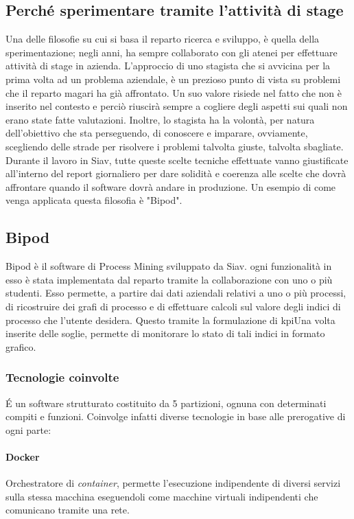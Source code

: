 \subsection{Perché sperimentare tramite l'attività di stage}
Una delle filosofie su cui si basa il reparto ricerca e sviluppo, è quella della sperimentazione; negli anni, ha sempre collaborato con gli atenei per effettuare attività di stage in azienda. L'approccio di uno stagista che si avvicina per la prima volta ad un problema aziendale, è un prezioso punto di vista su problemi che il reparto magari ha già affrontato. Un suo valore risiede nel fatto che non è inserito nel contesto e perciò riuscirà sempre a cogliere degli aspetti sui quali non erano state fatte valutazioni. Inoltre, lo stagista ha la volontà, per natura dell'obiettivo che sta perseguendo, di conoscere e imparare, ovviamente, scegliendo delle strade per risolvere i problemi talvolta giuste, talvolta sbagliate. Durante il lavoro in Siav, tutte queste scelte tecniche effettuate vanno giustificate all'interno del report giornaliero per dare solidità e coerenza alle scelte che dovrà affrontare quando il software dovrà andare in produzione. Un esempio di come venga applicata questa filosofia è "Bipod".
\subsection{Bipod}
Bipod è il software di Process Mining sviluppato da Siav. ogni funzionalità in esso è stata implementata dal reparto tramite la collaborazione con uno o più studenti. Esso permette, a partire dai dati aziendali relativi a uno o più processi, di ricostruire dei grafi di processo e di effettuare calcoli sul valore degli indici di processo che l'utente desidera. Questo tramite la formulazione di \acrshort{kpi}\glsfirstoccur Una volta inserite delle soglie, permette di monitorare lo stato di tali indici in formato grafico. 

\subsubsection{Tecnologie coinvolte}
\'E un software strutturato costituito da 5 partizioni, ognuna con determinati compiti e funzioni. Coinvolge infatti diverse tecnologie in base alle prerogative di ogni parte:
\paragraph{Docker} Orchestratore di \textit{container}, permette l'esecuzione indipendente di diversi servizi sulla stessa macchina eseguendoli come macchine virtuali indipendenti che comunicano tramite una rete.
